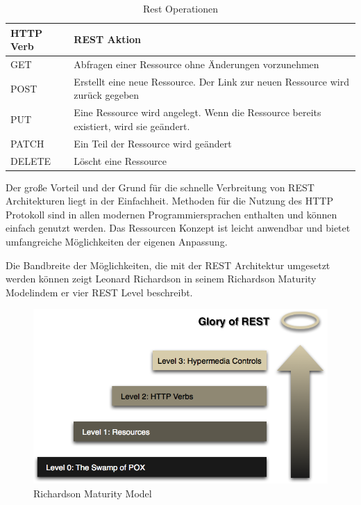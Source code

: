 		\begin{table}[h]
		
		\begin{tabular}{|p{3.5cm}|p{12.5cm}|}
		\hline 
		\textbf{HTTP Verb} & \textbf{REST Aktion} \\ 
		\hline 
		GET & Abfragen einer Ressource ohne Änderungen vorzunehmen \\ 
		\hline 
		POST & Erstellt eine neue Ressource. Der Link zur neuen Ressource wird zurück gegeben \\ 
		\hline 
		PUT & Eine Ressource wird angelegt. Wenn die Ressource bereits existiert, wird sie geändert. \\ 
		\hline 
		PATCH & Ein Teil der Ressource wird geändert \\ 
		\hline 
		DELETE & Löscht eine Ressource \\ 
		\hline 
		\end{tabular} 
		\caption{Rest Operationen}
		\label{tbl:RestOperationen}
		\end{table}
		
		Der große Vorteil und der Grund für die schnelle Verbreitung von REST Architekturen liegt in der Einfachheit. Methoden für die Nutzung des HTTP Protokoll sind in allen modernen Programmiersprachen enthalten und können einfach genutzt werden. Das Ressourcen Konzept ist leicht anwendbar und bietet umfangreiche Möglichkeiten der eigenen Anpassung.
		
		Die Bandbreite der Möglichkeiten, die mit der REST Architektur umgesetzt werden können zeigt Leonard Richardson in seinem \textacutedbl Richardson Maturity Model\textgravedbl  indem er vier REST Level beschreibt.
	
		\begin{figure}[h]
			\centering
			\includegraphics[width=0.7\linewidth]{images/Richardson_Maturity_Model}
			\caption{Richardson Maturity Model}
			\label{fig:Richardson_Maturity_Model}
		\end{figure}
		
